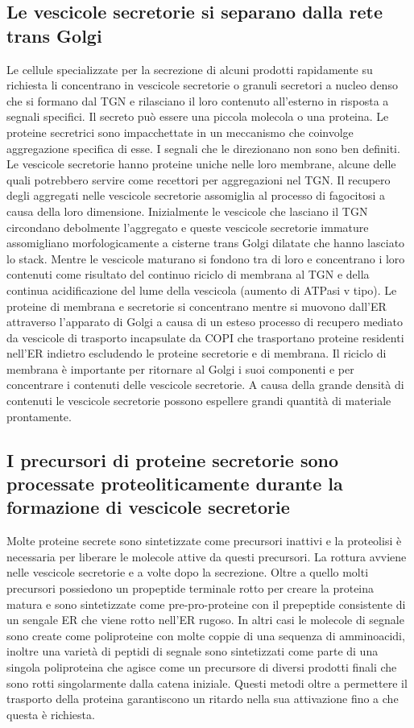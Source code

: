 \subsection{Le vescicole secretorie si separano dalla rete trans Golgi}
Le cellule specializzate per la secrezione di alcuni prodotti rapidamente su richiesta li concentrano in vescicole secretorie o granuli secretori a nucleo denso che si formano dal TGN
e rilasciano il loro contenuto all'esterno in risposta a segnali specifici. Il secreto pu\`o essere una piccola molecola o una proteina. Le proteine secretrici sono impacchettate in
un meccanismo che coinvolge aggregazione specifica di esse. I segnali che le direzionano non sono ben definiti. Le vescicole secretorie hanno proteine uniche nelle loro membrane, alcune
delle quali potrebbero servire come recettori per aggregazioni nel TGN. Il recupero degli aggregati nelle vescicole secretorie assomiglia al processo di fagocitosi a causa della loro 
dimensione. Inizialmente le vescicole che lasciano il TGN circondano debolmente l'aggregato e queste vescicole secretorie immature assomigliano morfologicamente a cisterne trans Golgi
dilatate che hanno lasciato lo stack. Mentre le vescicole maturano si fondono tra di loro e concentrano i loro contenuti come risultato del continuo riciclo di membrana al TGN e della
continua acidificazione del lume della vescicola (aumento di ATPasi v tipo). Le proteine di membrana e secretorie si concentrano mentre si muovono dall'ER attraverso l'apparato di
Golgi a causa di un esteso processo di recupero mediato da vescicole di trasporto incapsulate da COPI che trasportano proteine residenti nell'ER indietro escludendo le proteine
secretorie e di membrana. Il riciclo di membrana \`e importante per ritornare al Golgi i suoi componenti e per concentrare i contenuti delle vescicole secretorie. A causa della grande 
densit\`a di contenuti le vescicole secretorie possono espellere grandi quantit\`a di materiale prontamente.
\subsection{I precursori di proteine secretorie sono processate proteoliticamente durante la formazione di vescicole secretorie}
Molte proteine secrete sono sintetizzate come precursori inattivi e la proteolisi \`e necessaria per liberare le molecole attive da questi precursori. La rottura avviene nelle vescicole
secretorie e a volte dopo la secrezione. Oltre a quello molti precursori possiedono un propeptide  terminale rotto per creare la proteina matura e sono sintetizzate come 
pre-pro-proteine con il prepeptide consistente di un sengale ER che viene rotto nell'ER rugoso. In altri casi le molecole di segnale sono create come poliproteine con molte coppie
di una sequenza di amminoacidi, inoltre una variet\`a di peptidi di segnale sono sintetizzati come parte di una singola poliproteina che agisce come un precursore di diversi prodotti
finali che sono rotti singolarmente dalla catena iniziale. Questi metodi oltre a permettere il trasporto della proteina garantiscono un ritardo nella sua attivazione fino a che questa 
\`e richiesta. 
